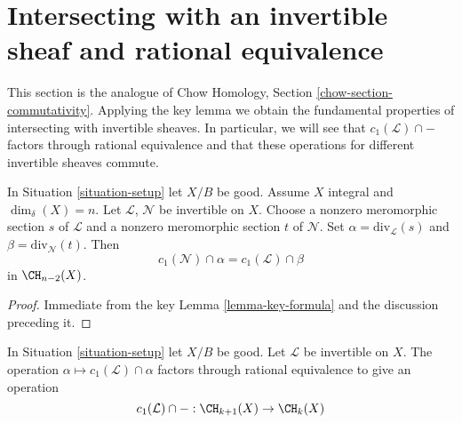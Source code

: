 \section{Intersecting with an invertible sheaf and rational equivalence}
\label{section-commutativity}

\noindent
This section is the analogue of Chow Homology, Section
\ref{chow-section-commutativity}.
Applying the key lemma we obtain the fundamental properties of intersecting
with invertible sheaves. In particular, we will see that
$c_1(\mathcal{L}) \cap -$ factors through rational equivalence and
that these operations for different invertible sheaves commute.

\begin{lemma}
\label{lemma-commutativity-on-integral}
In Situation \ref{situation-setup} let $X/B$ be good.
Assume $X$ integral and $\dim_\delta(X) = n$.
Let $\mathcal{L}$, $\mathcal{N}$ be invertible on $X$.
Choose a nonzero meromorphic section $s$ of $\mathcal{L}$
and a nonzero meromorphic section $t$ of $\mathcal{N}$.
Set $\alpha = \text{div}_\mathcal{L}(s)$ and
$\beta = \text{div}_\mathcal{N}(t)$.
Then
$$
c_1(\mathcal{N}) \cap \alpha
=
c_1(\mathcal{L}) \cap \beta
$$
in $\CH_{n - 2}(X)$.
\end{lemma}

\begin{proof}
Immediate from the key Lemma \ref{lemma-key-formula}
and the discussion preceding it.
\end{proof}

\begin{lemma}
\label{lemma-factors}
In Situation \ref{situation-setup} let $X/B$ be good.
Let $\mathcal{L}$ be invertible on $X$.
The operation $\alpha \mapsto c_1(\mathcal{L}) \cap \alpha$
factors through rational equivalence to give an operation
$$
c_1(\mathcal{L}) \cap - : \CH_{k + 1}(X) \to \CH_k(X)
$$
\end{lemma}

